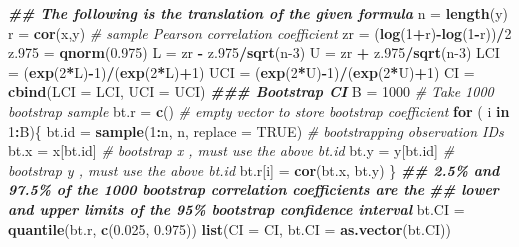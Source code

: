 \documentclass[
]{book}
\newenvironment{Shaded}{\begin{snugshade}}{\end{snugshade}}
\newcommand{\AttributeTok}[1]{\textcolor[rgb]{0.13,0.29,0.53}{#1}}
\newcommand{\CommentTok}[1]{\textcolor[rgb]{0.56,0.35,0.01}{\textit{#1}}}
\newcommand{\ConstantTok}[1]{\textcolor[rgb]{0.56,0.35,0.01}{#1}}
\newcommand{\ControlFlowTok}[1]{\textcolor[rgb]{0.13,0.29,0.53}{\textbf{#1}}}
\newcommand{\DecValTok}[1]{\textcolor[rgb]{0.00,0.00,0.81}{#1}}
\newcommand{\DocumentationTok}[1]{\textcolor[rgb]{0.56,0.35,0.01}{\textbf{\textit{#1}}}}
\newcommand{\FloatTok}[1]{\textcolor[rgb]{0.00,0.00,0.81}{#1}}
\newcommand{\FunctionTok}[1]{\textcolor[rgb]{0.13,0.29,0.53}{\textbf{#1}}}
\newcommand{\NormalTok}[1]{#1}
\newcommand{\OtherTok}[1]{\textcolor[rgb]{0.56,0.35,0.01}{#1}}
\newcommand{\SpecialCharTok}[1]{\textcolor[rgb]{0.81,0.36,0.00}{\textbf{#1}}}
\begin{document}
\begin{Shaded}
\begin{Highlighting}[]
\DocumentationTok{\#\#  The following is the translation of the given formula}
\NormalTok{n }\OtherTok{=} \FunctionTok{length}\NormalTok{(y)}
\NormalTok{r }\OtherTok{=} \FunctionTok{cor}\NormalTok{(x,y)    }\CommentTok{\# sample Pearson correlation coefficient}
\NormalTok{zr }\OtherTok{=}\NormalTok{ (}\FunctionTok{log}\NormalTok{(}\DecValTok{1}\SpecialCharTok{+}\NormalTok{r)}\SpecialCharTok{{-}}\FunctionTok{log}\NormalTok{(}\DecValTok{1}\SpecialCharTok{{-}}\NormalTok{r))}\SpecialCharTok{/}\DecValTok{2}
\NormalTok{z}\FloatTok{.975} \OtherTok{=} \FunctionTok{qnorm}\NormalTok{(}\FloatTok{0.975}\NormalTok{)}
\NormalTok{L }\OtherTok{=}\NormalTok{ zr }\SpecialCharTok{{-}}\NormalTok{ z}\FloatTok{.975}\SpecialCharTok{/}\FunctionTok{sqrt}\NormalTok{(n}\DecValTok{{-}3}\NormalTok{)}
\NormalTok{U }\OtherTok{=}\NormalTok{ zr }\SpecialCharTok{+}\NormalTok{ z}\FloatTok{.975}\SpecialCharTok{/}\FunctionTok{sqrt}\NormalTok{(n}\DecValTok{{-}3}\NormalTok{)}
\NormalTok{LCI }\OtherTok{=}\NormalTok{ (}\FunctionTok{exp}\NormalTok{(}\DecValTok{2}\SpecialCharTok{*}\NormalTok{L)}\SpecialCharTok{{-}}\DecValTok{1}\NormalTok{)}\SpecialCharTok{/}\NormalTok{(}\FunctionTok{exp}\NormalTok{(}\DecValTok{2}\SpecialCharTok{*}\NormalTok{L)}\SpecialCharTok{+}\DecValTok{1}\NormalTok{)}
\NormalTok{UCI }\OtherTok{=}\NormalTok{ (}\FunctionTok{exp}\NormalTok{(}\DecValTok{2}\SpecialCharTok{*}\NormalTok{U)}\SpecialCharTok{{-}}\DecValTok{1}\NormalTok{)}\SpecialCharTok{/}\NormalTok{(}\FunctionTok{exp}\NormalTok{(}\DecValTok{2}\SpecialCharTok{*}\NormalTok{U)}\SpecialCharTok{+}\DecValTok{1}\NormalTok{)}
\NormalTok{CI }\OtherTok{=} \FunctionTok{cbind}\NormalTok{(}\AttributeTok{LCI =}\NormalTok{ LCI, }\AttributeTok{UCI =}\NormalTok{ UCI)}
\DocumentationTok{\#\#\# Bootstrap CI}
\NormalTok{B }\OtherTok{=} \DecValTok{1000}              \CommentTok{\# Take 1000 bootstrap sample}
\NormalTok{bt.r }\OtherTok{=} \FunctionTok{c}\NormalTok{()            }\CommentTok{\# empty vector to store bootstrap coefficient}
\ControlFlowTok{for}\NormalTok{ ( i }\ControlFlowTok{in} \DecValTok{1}\SpecialCharTok{:}\NormalTok{B)\{}
\NormalTok{  bt.id }\OtherTok{=} \FunctionTok{sample}\NormalTok{(}\DecValTok{1}\SpecialCharTok{:}\NormalTok{n, n, }\AttributeTok{replace =} \ConstantTok{TRUE}\NormalTok{)   }\CommentTok{\# bootstrapping observation IDs}
\NormalTok{  bt.x }\OtherTok{=}\NormalTok{ x[bt.id]     }\CommentTok{\# bootstrap x , must use the above bt.id}
\NormalTok{  bt.y }\OtherTok{=}\NormalTok{ y[bt.id]     }\CommentTok{\# bootstrap y , must use the above bt.id}
\NormalTok{  bt.r[i] }\OtherTok{=} \FunctionTok{cor}\NormalTok{(bt.x, bt.y)}
\NormalTok{\}}
\DocumentationTok{\#\# 2.5\% and 97.5\% of the 1000 bootstrap correlation coefficients are the}
\DocumentationTok{\#\# lower and upper limits of the 95\% bootstrap confidence interval}
\NormalTok{bt.CI }\OtherTok{=} \FunctionTok{quantile}\NormalTok{(bt.r, }\FunctionTok{c}\NormalTok{(}\FloatTok{0.025}\NormalTok{, }\FloatTok{0.975}\NormalTok{))}
\FunctionTok{list}\NormalTok{(}\AttributeTok{CI =}\NormalTok{ CI, }\AttributeTok{bt.CI =} \FunctionTok{as.vector}\NormalTok{(bt.CI))}
\end{Highlighting}
\end{Shaded}
\end{document}
